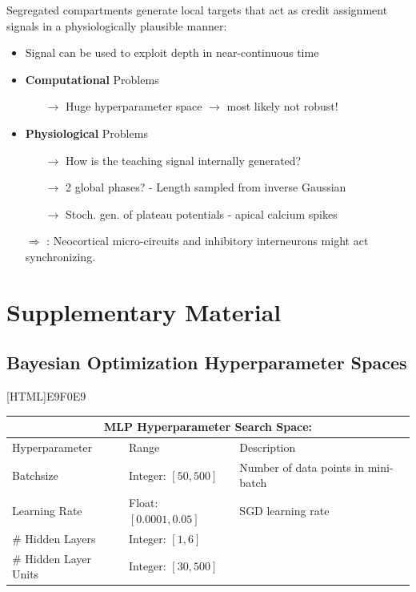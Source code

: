 \documentclass[colorinlistoftodos]{article}
\theoremstyle{definition}
\begin{document}
Segregated compartments generate local targets that act as credit assignment signals in a physiologically plausible manner:
\begin{itemize}
	\item Signal can be used to exploit depth in near-continuous time
	\item \textbf{Computational} Problems
	\begin{itemize}
		\item[$\rightarrow$] Huge hyperparameter space $\to$ most likely not robust!
	\end{itemize}
	\item \textbf{Physiological} Problems
	\begin{itemize}
	\item[$\rightarrow$] How is the teaching signal internally generated?
	\item[$\rightarrow$] 2 global phases? - Length sampled from inverse Gaussian
	\item[$\rightarrow$] Stoch. gen. of plateau potentials - apical calcium spikes
	\end{itemize}
	\item[$\Rightarrow$] \citet{sacramento2018}: Neocortical micro-circuits and inhibitory interneurons might act synchronizing.
\end{itemize}




\setlength{\bibsep}{4pt plus 0.3ex}

{\footnotesize }

\section*{Supplementary Material}

\subsection*{Bayesian Optimization Hyperparameter Spaces}

[HTML]{E9F0E9}{\parbox{\textwidth}{%
\small{
\begin{center}
\begin{tabular}{ |p{3cm}||p{3cm}|p{6cm}| }
 \hline
 \multicolumn{3}{|c|}{\textbf{MLP Hyperparameter Search Space:}} \\
 \hline
Hyperparameter & Range & Description\\
 \hline
 Batchsize & Integer: $[50, 500]$ & Number of data points in mini-batch\\
 Learning Rate & Float: $[0.0001, 0.05]$ & SGD learning rate\\
 \# Hidden Layers & Integer: $[1, 6]$ & \\ 
 \# Hidden Layer Units & Integer: $[30, 500]$ & \\ 
 \hline
\end{tabular}	
\end{center}
}}}
\end{document}
